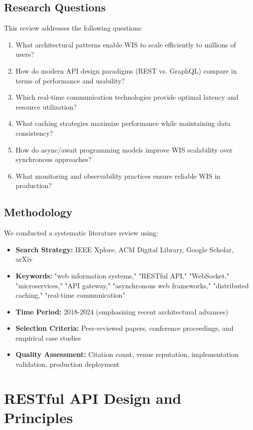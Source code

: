 \documentclass[conference]{IEEEtran}
\begin{document}
\subsection{Research Questions}

This review addresses the following questions:

\begin{enumerate}
    \item What architectural patterns enable WIS to scale efficiently to millions of users?
    \item How do modern API design paradigms (REST vs. GraphQL) compare in terms of performance and usability?
    \item Which real-time communication technologies provide optimal latency and resource utilization?
    \item What caching strategies maximize performance while maintaining data consistency?
    \item How do async/await programming models improve WIS scalability over synchronous approaches?
    \item What monitoring and observability practices ensure reliable WIS in production?
\end{enumerate}

\subsection{Methodology}

We conducted a systematic literature review using:

\begin{itemize}
    \item \textbf{Search Strategy:} IEEE Xplore, ACM Digital Library, Google Scholar, arXiv
    \item \textbf{Keywords:} "web information systems," "RESTful API," "WebSocket," "microservices," "API gateway," "asynchronous web frameworks," "distributed caching," "real-time communication"
    \item \textbf{Time Period:} 2018-2024 (emphasizing recent architectural advances)
    \item \textbf{Selection Criteria:} Peer-reviewed papers, conference proceedings, and empirical case studies
    \item \textbf{Quality Assessment:} Citation count, venue reputation, implementation validation, production deployment
\end{itemize}

\section{RESTful API Design and Principles}
\end{document}
